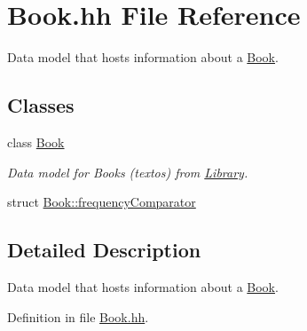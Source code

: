 \hypertarget{_book_8hh}{\section{Book.\+hh File Reference}
\label{_book_8hh}
}


Data model that hosts information about a \hyperlink{class_book}{Book}.  


\subsection*{Classes}
\begin{DoxyCompactItemize}
\item 
class \hyperlink{class_book}{Book}
\begin{DoxyCompactList}\small\item\em Data model for Books (textos) from \hyperlink{class_library}{Library}. \end{DoxyCompactList}\item 
struct \hyperlink{struct_book_1_1frequency_comparator}{Book\+::frequency\+Comparator}
\end{DoxyCompactItemize}


\subsection{Detailed Description}
Data model that hosts information about a \hyperlink{class_book}{Book}. 



Definition in file \hyperlink{_book_8hh_source}{Book.\+hh}.


